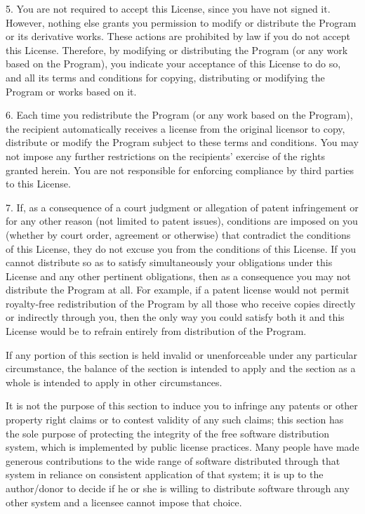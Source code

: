 \begin{small}
5. You are not required to accept this License, since you have not signed it.
However, nothing else grants you permission to modify or distribute the
Program or its derivative works. These actions are prohibited by law if you do
not accept this License. Therefore, by modifying or distributing the Program
(or any work based on the Program), you indicate your acceptance of this
License to do so, and all its terms and conditions for copying, distributing
or modifying the Program or works based on it.

6. Each time you redistribute the Program (or any work based on the Program),
the recipient automatically receives a license from the original licensor to
copy, distribute or modify the Program subject to these terms and conditions.
You may not impose any further restrictions on the recipients' exercise of the
rights granted herein. You are not responsible for enforcing compliance by
third parties to this License.

7. If, as a consequence of a court judgment or allegation of patent
infringement or for any other reason (not limited to patent issues),
conditions are imposed on you (whether by court order, agreement or otherwise)
that contradict the conditions of this License, they do not excuse you from
the conditions of this License. If you cannot distribute so as to satisfy
simultaneously your obligations under this License and any other pertinent
obligations, then as a consequence you may not distribute the Program at all.
For example, if a patent license would not permit royalty-free redistribution
of the Program by all those who receive copies directly or indirectly through
you, then the only way you could satisfy both it and this License would be to
refrain entirely from distribution of the Program.

If any portion of this section is held invalid or unenforceable under any
particular circumstance, the balance of the section is intended to apply and
the section as a whole is intended to apply in other circumstances.

It is not the purpose of this section to induce you to infringe any patents or
other property right claims or to contest validity of any such claims; this
section has the sole purpose of protecting the integrity of the free software
distribution system, which is implemented by public license practices. Many
people have made generous contributions to the wide range of software
distributed through that system in reliance on consistent application of that
system; it is up to the author/donor to decide if he or she is willing to
distribute software through any other system and a licensee cannot impose that
choice.


\end{small}
